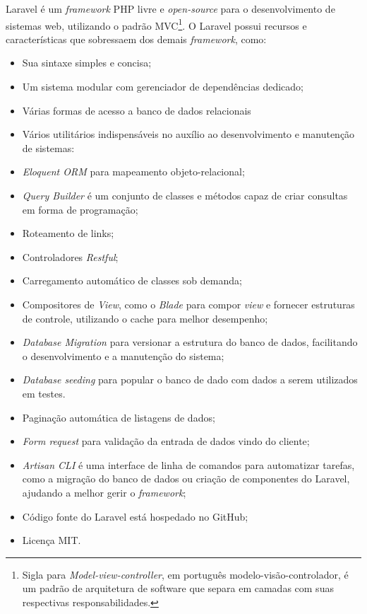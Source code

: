 \documentclass[
  12pt,				%
  openany,
  oneside,
  a4paper,			%
  english,			%
  brazil
]{article}
\numberwithin{figure}{section}
\numberwithin{table}{section}
\newcounter{subsubsubsection}[subsubsection]
\begin{document}
Laravel é um \textit{framework} PHP livre e \textit{open-source} para o desenvolvimento de sistemas web, utilizando o padrão MVC\footnote{Sigla para \textit{Model-view-controller}, em português modelo-visão-controlador, é um padrão de arquitetura de software que separa em camadas com suas respectivas responsabilidades.}. O Laravel possui recursos e características que sobressaem dos demais \textit{framework}, como: 

{\singlespacing
\begin{itemize}
  \item Sua sintaxe simples e concisa;
  \item Um sistema modular com gerenciador de dependências dedicado;
  \item Várias formas de acesso a banco de dados relacionais
  \item Vários utilitários indispensáveis no auxílio ao desenvolvimento e manutenção de sistemas:
  \item \textit{Eloquent ORM} para mapeamento objeto-relacional;
  \item \textit{Query Builder} é um conjunto de classes e métodos capaz de criar consultas em forma de programação;
  \item Roteamento de links;
  \item Controladores \textit{Restful};
  \item Carregamento automático de classes sob demanda;
  \item Compositores de \textit{View}, como o \textit{Blade} para compor \textit{view} e fornecer estruturas de controle, utilizando o cache para melhor desempenho;
  \item \textit{Database Migration} para versionar a estrutura do banco de dados, facilitando o desenvolvimento e a manutenção do sistema;
  \item \textit{Database seeding} para popular o banco de dado com dados a serem utilizados em testes.
  \item Paginação automática de listagens de dados;
  \item \textit{Form request} para validação da entrada de dados vindo do cliente;
  \item \textit{Artisan CLI} é uma interface de linha de comandos para automatizar tarefas, como a migração do banco de dados ou criação de componentes do Laravel, ajudando a melhor gerir o \textit{framework};
  \item Código fonte do Laravel está hospedado no GitHub;
  \item Licença MIT.
\end{itemize}
}
\end{document}
